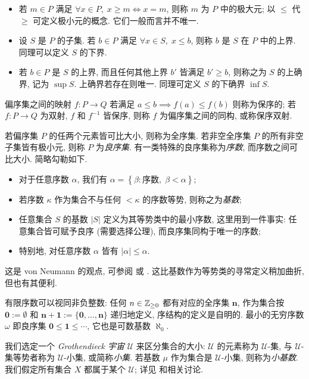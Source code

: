 \begin{itemize}
	\item 若 $m \in P$ 满足 $\forall x \in P, \; x \geq m \iff x = m$, 则称 $m$ 为 $P$ 中的极大元; 以 $\leq$ 代 $\geq$ 可定义极小元的概念. 它们一般而言并不唯一.
	\item 设 $S$ 是 $P$ 的子集. 若 $b \in P$ 满足 $\forall x \in S, \; x \leq b$, 则称 $b$ 是 $S$ 在 $P$ 中的上界. 同理可以定义 $S$ 的下界.
	\item 若 $b \in P$ 是 $S$ 的上界, 而且任何其他上界 $b'$ 皆满足 $b' \geq b$, 则称之为 $S$ 的上确界, 记为 $\sup S$. 上确界若存在则唯一. 同理可定义 $S$ 的下确界 $\inf S$.
\end{itemize}

偏序集之间的映射 $f: P \to Q$ 若满足 $a \leq b \implies f(a) \leq f(b)$ 则称为保序的; 若 $f: P \to Q$ 为双射, $f$ 和 $f^{-1}$ 皆保序, 则称 $f$ 为偏序集之间的同构, 或称保序双射.

若偏序集 $P$ 的任两个元素皆可比大小, 则称为全序集. 若非空全序集 $P$ 的所有非空子集皆有极小元, 则称 $P$ 为\emph{良序集}. 有一类特殊的良序集称为\emph{序数}, 而序数之间可比大小. 简略勾勒如下.
\begin{itemize}
	\item 对于任意序数 $\alpha$, 我们有 $\alpha = \left\{ \beta: \text{序数}, \; \beta < \alpha \right\}$;
	\item 若序数 $\kappa$ 作为集合不与任何 $< \kappa$ 的序数等势, 则称之为\emph{基数}; 
	\item 任意集合 $S$ 的基数 $|S|$ 定义为其等势类中的最小序数, 这里用到一件事实: 任意集合皆可赋予良序 (需要选择公理), 而良序集同构于唯一的序数;
	\item 特别地, 对任意序数 $\alpha$ 皆有 $|\alpha| \leq \alpha$.
\end{itemize}
这是 von Neumann 的观点, 可参阅 \cite[\S 1.2]{Li1} 或 \cite{Je03}. 这比基数作为等势类的寻常定义稍加曲折, 但也有其便利.

有限序数可以视同非负整数: 任何 $n \in \mathbb{Z}_{\geq 0}$ 都有对应的全序集 $\mathbf{n}$, 作为集合按 $\mathbf{0} := \emptyset$ 和 $\mathbf{n+1} := \{\mathbf{0}, \ldots, \mathbf{n}\}$ 递归地定义, 序结构的定义是自明的. 最小的无穷序数 $\omega$ 即良序集 $\mathbf{0} \leq \mathbf{1} \leq \cdots$, 它也是可数基数 $\aleph_0$.

我们选定一个 \emph{Grothendieck 宇宙} $\mathcal{U}$ 来区分集合的大小: $\mathcal{U}$ 的元素称为 $\mathcal{U}$-集, 与 $\mathcal{U}$-集等势者称为 $\mathcal{U}$-小集, 或简称\emph{小集}. 若基数 $\mu$ 作为集合是 $\mathcal{U}$-小集, 则称为\emph{小基数}. 我们假定所有集合 $X$ 都属于某个 $\mathcal{U}$; 详见 \cite[假设 1.5.2]{Li1} 和相关讨论.

